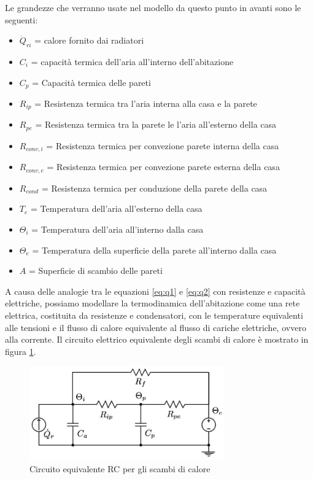 \documentclass[laurea,oneside,11pt]{USiena_tesiLM}
\begin{document}
Le grandezze che verranno usate nel modello da questo punto in avanti sono le seguenti:
\begin{itemize}
\item[] $\dot{Q}_{ri}$ = calore fornito dai radiatori
\item[]$C_i$ = capacità termica dell'aria all'interno dell'abitazione
\item[]$C_p$ = Capacità termica delle pareti
\item[]$R_{ip}$ = Resistenza termica tra l'aria interna alla casa e la parete
\item[]$R_{pe}$ = Resistenza termica tra la parete le l'aria all'esterno della casa
\item[]$R_{conv,i}$ = Resistenza termica per convezione   parete interna della casa
\item[]$R_{conv,e}$ = Resistenza termica per convezione  parete esterna della casa
\item[]$R_{cond}$ = Resistenza termica per conduzione della parete della casa
\item[]$T_{e}$ = Temperatura dell'aria all'esterno della casa
\item[]$\Theta_i$ = Temperatura dell'aria all'interno dalla casa
\item[]$\Theta_e$ = Temperatura della superficie della parete all'interno dalla casa 
\item[]$A$ = Superficie di scambio delle pareti
\end{itemize}


A causa delle analogie tra le equazioni \ref{eq:q1} e \ref{eq:q2} con resistenze e capacità elettriche, possiamo modellare la termodinamica dell'abitazione come una rete elettrica, costituita da resistenze e condensatori, con le temperature equivalenti alle tensioni e il flusso di calore equivalente al flusso di cariche elettriche, ovvero alla corrente. Il circuito elettrico equivalente degli scambi di calore è mostrato in figura \ref{fig:RC}.

\begin{figure}[h]
\begin{center}
\includegraphics[width=0.75\textwidth]{figure/schema_trasf_calore}
\caption{Circuito equivalente RC per gli scambi di calore}
\label{fig:RC}
\end{center}
\end{figure}
 
\end{document}
